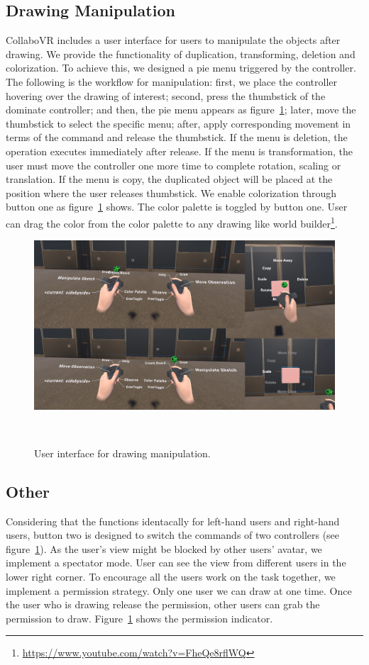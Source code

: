 \documentclass{sigchi}
\begin{document}
\subsection{Drawing Manipulation}
CollaboVR includes a user interface for users to manipulate the objects after drawing. We provide the functionality of duplication, transforming, deletion and colorization. To achieve this, we designed a pie menu triggered by the controller. The following is the workflow for manipulation: first, we place the controller hovering over the drawing of interest; second, press the thumbstick of the dominate controller; and then, the pie menu appears as figure~\ref{fig:userinterface}; later, move the thumbstick to select the specific menu; after, apply corresponding movement in terms of the command and release the thumbstick. If the menu is deletion, the operation executes immediately after release. If the menu is transformation, the user must move the controller one more time to complete rotation, scaling or translation. If the menu is copy, the duplicated object will be placed at the position where the user releases thumbstick. We enable colorization through button one as figure~\ref{fig:userinterface} shows. The color palette is toggled by button one. User can drag the color from the color palette to any drawing like world builder\footnote{\url{https://www.youtube.com/watch?v=FheQe8rflWQ}}.

\begin{figure}[tb!]
 \centering
 \includegraphics[width=0.9\columnwidth]{Figure6.png}
 \caption{User interface for drawing manipulation.
 }~\label{fig:userinterface}
\end{figure}

\subsection{Other}
Considering that the functions identacally for left-hand users and right-hand users, button two is designed to switch the commands of two controllers (see figure~\ref{fig:userinterface}). As the user's view might be blocked by other users' avatar, we implement a spectator mode. User can see the view from different users in the lower right corner. To encourage all the users work on the task together, we implement a permission strategy. Only one user we can draw at one time. Once the user who is drawing release the permission, other users can grab the permission to draw. Figure~\ref{fig:userinterface} shows the permission indicator.
\end{document}
